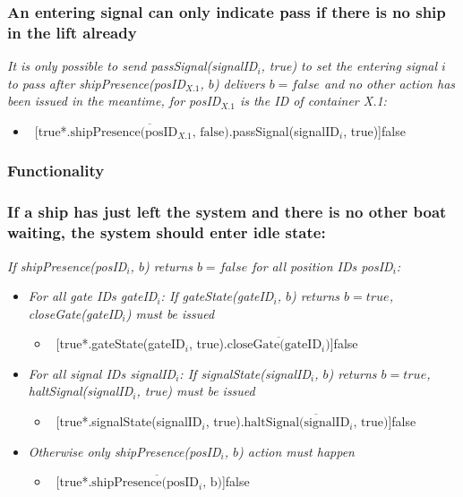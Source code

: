 \subsubsection{An entering signal can only indicate pass if there is no ship in the lift already}
\textit{It is only possible to send passSignal(signalID$_i$, true) to set the entering signal $i$ to pass after shipPresence(posID$_{X.1}$, $b$) delivers $b = false$ and no other action has been issued in the meantime, for posID$_{X.1}$ is the ID of container X.1:}
	\begin{itemize}
		\item ~[true*.$\overline{\textrm{shipPresence(posID$_{X.1}$, false)}}$.passSignal(signalID$_i$, true)]false
	\end{itemize}

	
\subsubsection*{Functionality}
\subsubsection{If a ship has just left the system and there is no other boat waiting, the system should enter idle state:}
\textit{If shipPresence(posID$_i$, $b$) returns $b = false$ for all position IDs posID$_i$:}
	\begin{itemize}
		\item \textit{For all gate IDs gateID$_i$: If gateState(gateID$_i$, $b$) returns $b = true$, \linebreak closeGate(gateID$_i$) must be issued}
		\begin{itemize}
			\item ~[true*.gateState(gateID$_i$, true).$\overline{\textrm{closeGate(gateID$_i$)}}$]false
		\end{itemize}
		\item \textit{For all signal IDs signalID$_i$: If signalState(signalID$_i$, $b$) returns $b = true$, haltSignal(signalID$_i$, true) must be issued}
		\begin{itemize}
			\item ~[true*.signalState(signalID$_i$, true).$\overline{\textrm{haltSignal(signalID$_i$, true)}}$]false
		\end{itemize}
		\item \textit{Otherwise only shipPresence(posID$_i$, $b$) action must happen}
		\begin{itemize}
			\item ~[true*.$\overline{\textrm{shipPresence(posID$_i$, b)}}$]false
		\end{itemize}
	\end{itemize}
	
